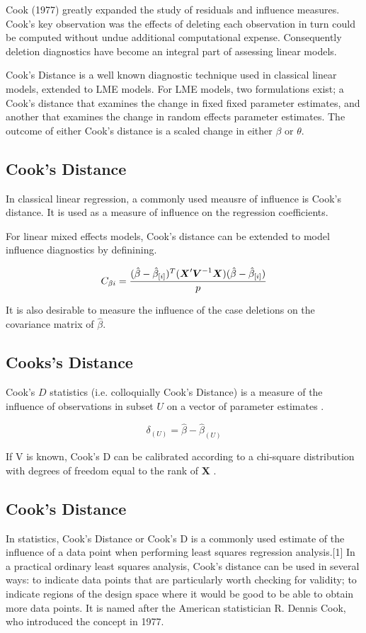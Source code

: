 \documentclass[Main.tex]{subfiles}
\begin{document}
	
	Cook (1977) greatly expanded the study of residuals and influence measures. Cook's key observation was the effects of deleting each observation in turn could be computed without undue additional computational expense. Consequently deletion diagnostics have become an integral part of assessing linear models.
	
	Cook's Distance is a well known diagnostic technique used in classical linear models, extended to LME models.  For LME models, two formulations exist; a Cook's distance that examines the change in fixed fixed parameter estimates, and another that examines the change in random effects parameter estimates. The outcome of either Cook's distance is a scaled change in either $\beta$ or $\theta$.
	
	
	\subsection{Cook's Distance}%
	In classical linear regression, a commonly used meausre of influence is Cook's distance. It is used as a measure of influence on the regression coefficients.
	
	For linear mixed effects models, Cook's distance can be extended to model influence diagnostics by definining.
	
	\[ C_{\beta i} = {(\hat{\beta} - \hat{\beta}_{[i]})^{T}(\boldsymbol{X}^{\prime}\boldsymbol{V}^{-1}\boldsymbol{X}) (\hat{\beta} - \hat{\beta}_{[i]}) \over p}\]
	
	It is also desirable to measure the influence of the case deletions on the covariance matrix of $\hat{\beta}$.
	
	
	\subsection{Cooks's Distance}%
	 Cook's $D$ statistics (i.e. colloquially Cook's Distance) is a measure of the influence of observations in subset $U$ on a vector of parameter estimates \citep{cook77}.
	
	\[ \delta_{(U)} = \hat{\beta} - \hat{\beta}_{(U)}\]
	
	If V is known, Cook's D can be calibrated according to a chi-square distribution with degrees of freedom equal to the rank of $\boldsymbol{X}$ \citep{cpj92}.
	
	\subsection{Cook's Distance}
	In statistics, Cook's Distance or Cook's D is a commonly used estimate of the influence of a data point when performing least squares regression analysis.[1] In a practical ordinary least squares analysis, Cook's distance can be used in several ways: to indicate data points that are particularly worth checking for validity; to indicate regions of the design space where it would be good to be able to obtain more data points. It is named after the American statistician R. Dennis Cook, who introduced the concept in 1977.
	
\end{document}
